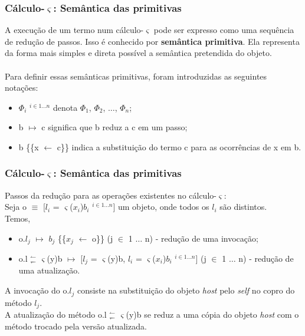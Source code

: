 \documentclass[10pt, compress]{beamer}
\begin{document}
\begin{frame}[fragile]
  \frametitle{Cálculo-$\varsigma$: Semântica das primitivas}
  A execução de um termo num cálculo-$\varsigma$ pode ser expresso como uma sequência de redução de passos.
  Isso é conhecido por {\bf semântica primitiva}. Ela representa da forma mais simples e direta possível a
  semântica pretendida do objeto.
  \\~\\
  Para definir essas semânticas primitivas, foram introduzidas as seguintes notações:
  \begin{itemize}
  \item $\Phi_{i}$ $^{i \in 1 \ldots n}$ denota $\Phi_{1}$, $\Phi_{2}$, $\ldots$, $\Phi_{n}$;
  \item b $\mapsto$ c significa que  b reduz a c em um passo;
  \item b \{\{x $\leftarrow$ c\}\} indica a substituição do termo c para as ocorrências de x em b.
  \end{itemize}
\end{frame}

\begin{frame}[fragile]
  \frametitle{Cálculo-$\varsigma$: Semântica das primitivas}
  Passos da redução para as operações existentes no cálculo-$\varsigma$:
  \\
  Seja o $\equiv$ [$l_{i}$ = $\varsigma$($x_{i}$)$b_{i}$ $^{i \in 1 \ldots n}$] um objeto, onde todos os $l_{i}$ são distintos. 
  \\
  Temos,
  \begin{itemize}
  \item o.$l_{j}$ $\mapsto$ $b_{j}$ \{\{$x_{j}$ $\leftarrow$ o\}\} (j $\in$ 1 $\ldots$ n) - redução de uma invocação;
  \item o.l $^{\leftharpoonup}_{\leftharpoondown}$ $\varsigma$(y)b $\mapsto$
    [$l_{j}$ = $\varsigma$(y)b, $l_{i}$ = $\varsigma$($x_{i}$)$b_{i}$ $^{i \in 1 \ldots n}$] (j $\in$ 1 $\ldots$ n) - redução de uma atualização.
  \end{itemize}
  A invocação do o.$l_{j}$ consiste na substituição do objeto \textit{host} pelo \textit{self} no copro do método $l_{j}$.
  \\
  A atualização do método o.l $^{\leftharpoonup}_{\leftharpoondown}$  $\varsigma$(y)b se reduz a uma cópia do objeto \textit{host}
  com o método trocado pela versão atualizada.
\end{frame}
\end{document}
